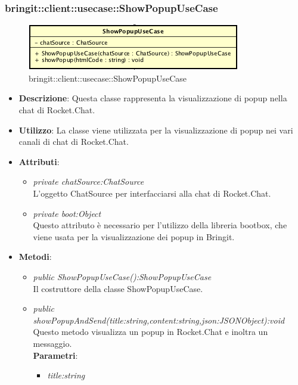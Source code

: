 \subsubsection{bringit::client::usecase::ShowPopupUseCase}

\label{bringit::client::usecase::ShowPopupUseCase}
\begin{figure}[H]
	\centering
	\includegraphics[scale=0.5]{Sezioni/SottosezioniST/img/app/ShowPopupUseCase.png}
	\caption{bringit::client::usecase::ShowPopupUseCase}
\end{figure}

\begin{itemize}
\item \textbf{Descrizione}: Questa classe rappresenta la visualizzazione di popup nella chat di Rocket.Chat.
\item \textbf{Utilizzo}: La classe viene utilizzata per la visualizzazione di popup nei vari canali di chat di Rocket.Chat.
\item \textbf{Attributi}: 
	\begin{itemize}
	\item \textit{private chatSource:ChatSource}\\
	L'oggetto ChatSource per interfacciarsi alla chat di Rocket.Chat.
	\item \textit{private boot:Object}\\
	Questo attributo è necessario per l'utilizzo della libreria bootbox, che viene usata per la visualizzazione dei popup in Bringit.
	\end{itemize}
\item \textbf{Metodi}:
	\begin{itemize}
	\item \textit{public ShowPopupUseCase():ShowPopupUseCase}\\
	Il costruttore della classe ShowPopupUseCase.
	\item \textit{public showPopupAndSend(title:string,content:string,json:JSONObject):void}\\
	Questo metodo visualizza un popup in Rocket.Chat e inoltra un messaggio.
			\\ \textbf{Parametri}: \begin{itemize}
				\item \textit{title:string}\\

\end{itemize}
\end{itemize}
\end{itemize}
